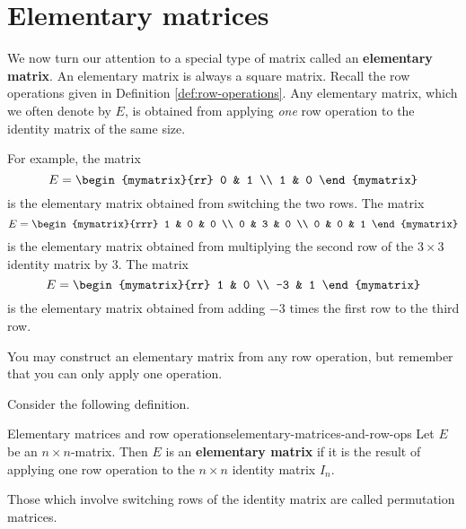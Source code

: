 
\section{Elementary matrices}

We now turn our attention to a special type of matrix called an \textbf{elementary matrix}. 
An elementary matrix is always a square matrix. Recall the row operations given in Definition \ref{def:row-operations}.
Any elementary matrix, which we often denote by $E$, is obtained from applying
{\em one\em} row operation to the identity matrix of the same size. 

For example, the matrix
\begin{equation*}
E = 
\begin{mymatrix}{rr}
0 & 1 \\
1 & 0
\end{mymatrix}
\end{equation*}
is the elementary matrix obtained from switching the two rows. 
The matrix 
\begin{equation*}
E = 
\begin{mymatrix}{rrr}
1 & 0 & 0 \\
0 & 3 & 0 \\
0 & 0 & 1
\end{mymatrix}
\end{equation*}
is the elementary matrix obtained from multiplying the second row of the $3 \times 3$ identity matrix
by $3$.
The matrix
\begin{equation*}
E = 
\begin{mymatrix}{rr}
1 & 0 \\
-3 & 1
\end{mymatrix}
\end{equation*}
is the elementary matrix obtained from adding $-3$ times the first row to the third row.

You may construct an elementary matrix from any row operation, but remember that you can only apply one operation.

Consider the following definition. 

\begin{definition}{Elementary matrices and row operations}{elementary-matrices-and-row-ops}
Let $E$ be an $n \times n$-matrix. Then $E$ is an \textbf{elementary matrix} 
if it is the result of applying one row operation to the $n \times n$ identity matrix $I_n$. 

Those which involve switching rows of the identity matrix are called
permutation matrices.
\end{definition}

